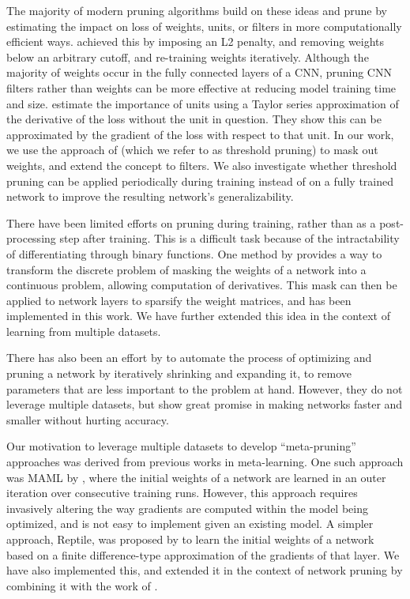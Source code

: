 \documentclass{article}
\begin{document}
The majority of modern pruning algorithms build on these ideas and prune by estimating the impact on loss of weights, units, or filters in more computationally efficient ways. \citet{NIPS_learning_weights_pruning} achieved this by imposing an L2 penalty, and removing weights below an arbitrary cutoff, and re-training weights iteratively. Although the majority of weights occur in the fully connected layers of a CNN, pruning CNN filters rather than weights can be more effective at reducing model training time and size. \citet{prune_transfer_learning} estimate the importance of units using a Taylor series approximation of the derivative of the loss without the unit in question. They show this can be approximated by the gradient of the loss with respect to that unit. In our work, we use the approach of \citet{NIPS_learning_weights_pruning} (which we refer to as threshold pruning) to mask out weights, and extend the concept to filters. We also investigate whether threshold pruning can be applied periodically during training instead of on a fully trained network to improve the resulting network’s generalizability.


There have been limited efforts on pruning during training, rather than as a post-processing step after training. This is a difficult task because of the intractability of differentiating through binary functions. One method by \citet{L0norm} provides a way to transform the discrete problem of masking the weights of a network into a continuous problem, allowing computation of derivatives. This mask can then be applied to network layers to sparsify the weight matrices, and has been implemented in this work. We have further extended this idea in the context of learning from multiple datasets.

There has also been an effort by \citet{morphnet} to automate the process of optimizing and pruning a network by iteratively shrinking and expanding it, to remove parameters that are less important to the problem at hand. However, they do not leverage multiple datasets, but show great promise in making networks faster and smaller without hurting accuracy.

Our motivation to leverage multiple datasets to develop ``meta-pruning'' approaches was derived from previous works in meta-learning. One such approach was MAML by \citet{maml}, where the initial weights of a network are learned in an outer iteration over consecutive training runs. However, this approach requires invasively altering the way gradients are computed within the model being optimized, and is not easy to implement given an existing model. A simpler approach, Reptile, was proposed by \citet{reptile} to learn the initial weights of a network based on a finite difference-type approximation of the gradients of that layer. We have also implemented this, and extended it in the context of network pruning by combining it with the work of \citet{L0norm}.
\end{document}
